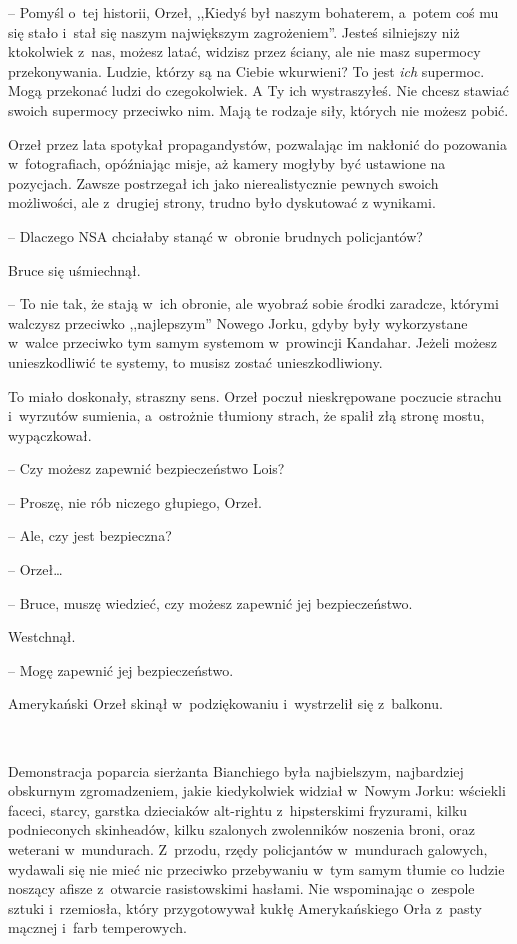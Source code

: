 \documentclass[oneside,polish,11pt,sfheadings]{mwbk}
\begin{document}
-- Pomyśl o~tej historii, Orzeł, ,,Kiedyś był naszym bohaterem, a~potem
coś mu się stało i~stał się naszym największym zagrożeniem''. Jesteś
silniejszy niż ktokolwiek z~nas, możesz latać, widzisz przez ściany, ale
nie masz supermocy przekonywania. Ludzie, którzy są na Ciebie wkurwieni?
To jest \textit{ich} supermoc. Mogą przekonać ludzi do czegokolwiek. A Ty
ich wystraszyłeś. Nie chcesz stawiać swoich supermocy przeciwko nim.
Mają te rodzaje siły, których nie możesz pobić.

Orzeł przez lata spotykał propagandystów, pozwalając im nakłonić do
pozowania w~fotografiach, opóźniając misje, aż kamery mogłyby być
ustawione na pozycjach. Zawsze postrzegał ich jako nierealistycznie
pewnych swoich możliwości, ale z~drugiej strony, trudno było dyskutować
z wynikami.

-- Dlaczego NSA chciałaby stanąć w~obronie brudnych policjantów?

Bruce się uśmiechnął. 

-- To nie tak, że stają w~ich obronie, ale wyobraź
sobie środki zaradcze, którymi walczysz przeciwko ,,najlepszym'' Nowego
Jorku, gdyby były wykorzystane w~walce przeciwko tym samym systemom w~prowincji Kandahar. Jeżeli możesz unieszkodliwić te systemy, to musisz
zostać unieszkodliwiony.

To miało doskonały, straszny sens. Orzeł poczuł nieskrępowane poczucie
strachu i~wyrzutów sumienia, a~ostrożnie tłumiony strach, że spalił złą
stronę mostu, wypączkował.

-- Czy możesz zapewnić bezpieczeństwo Lois?

-- Proszę, nie rób niczego głupiego, Orzeł.

-- Ale, czy jest bezpieczna?

-- Orzeł\ldots 

-- Bruce, muszę wiedzieć, czy możesz zapewnić jej bezpieczeństwo.

Westchnął. 

-- Mogę zapewnić jej bezpieczeństwo.

Amerykański Orzeł skinął w~podziękowaniu i~wystrzelił się z~balkonu.

~

Demonstracja poparcia sierżanta Bianchiego była najbielszym, najbardziej
obskurnym zgromadzeniem, jakie kiedykolwiek widział w~Nowym Jorku:
wściekli faceci, starcy, garstka dzieciaków alt-rightu z~hipsterskimi
fryzurami, kilku podnieconych skinheadów, kilku szalonych zwolenników
noszenia broni, oraz weterani w~mundurach. Z~przodu, rzędy policjantów w~mundurach galowych, wydawali się nie mieć nic przeciwko przebywaniu w~tym samym tłumie co ludzie noszący afisze z~otwarcie rasistowskimi
hasłami. Nie wspominając o~zespole sztuki i~rzemiosła, który
przygotowywał kukłę Amerykańskiego Orła z~pasty mącznej i~farb
temperowych.
\end{document}
